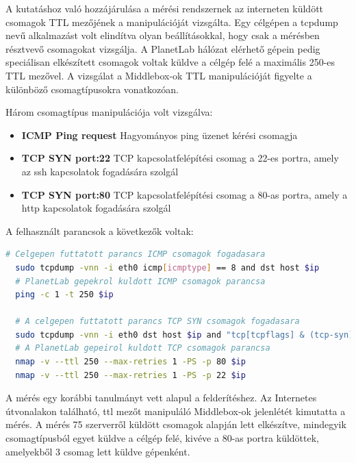 A kutatáshoz való hozzájárulása a mérési rendszernek az interneten küldött csomagok TTL mezőjének a manipulációját vizsgálta. Egy célgépen a tcpdump nevű alkalmazást volt elindítva olyan beállításokkal, hogy csak a mérésben résztvevő csomagokat vizsgálja. A PlanetLab hálózat elérhető gépein pedig speciálisan elkészített csomagok voltak küldve a célgép felé a maximális 250-es TTL mezővel. A vizsgálat a Middlebox-ok TTL manipulációját figyelte a különböző csomagtípusokra vonatkozóan.

Három csomagtípus manipulációja volt vizsgálva:

\begin{itemize}
\item \textbf{ICMP Ping request} Hagyományos ping üzenet kérési csomagja
\item \textbf{TCP SYN port:22} TCP kapcsolatfelépítési csomag a 22-es portra, amely az ssh kapcsolatok fogadására szolgál
\item \textbf{TCP SYN port:80} TCP kapcsolatfelépítési csomag a 80-as portra, amely a http kapcsolatok fogadására szolgál
\end{itemize}

A felhasznált parancsok a következők voltak:

\begin{lstlisting}[language=bash]
  # Celgepen futtatott parancs ICMP csomagok fogadasara
  sudo tcpdump -vnn -i eth0 icmp[icmptype] == 8 and dst host $ip
  # PlanetLab gepekrol kuldott ICMP csomagok parancsa
  ping -c 1 -t 250 $ip
  
  # A celgepen futtatott parancs TCP SYN csomagok fogadasara
  sudo tcpdump -vnn -i eth0 dst host $ip and "tcp[tcpflags] & (tcp-syn) != 0"
  # A PlanetLab gepeirol kuldott TCP csomagok parancsa
  nmap -v --ttl 250 --max-retries 1 -PS -p 80 $ip
  nmap -v --ttl 250 --max-retries 1 -PS -p 22 $ip
\end{lstlisting}


A mérés egy korábbi tanulmányt\cite{middlebox} vett alapul a felderítéshez. Az Internetes útvonalakon található, ttl mezőt manipuláló Middlebox-ok jelenlétét kimutatta a mérés. A mérés 75 szerverről küldött csomagok alapján lett elkészítve, mindegyik csomagtípusból egyet küldve a célgép felé, kivéve a 80-as portra küldöttek, amelyekből 3 csomag lett küldve gépenként.


